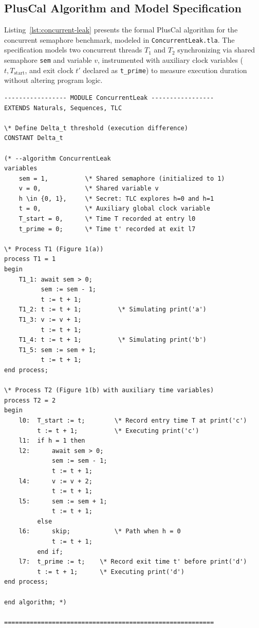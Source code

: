 \documentclass[a4paper,12pt]{report}
\begin{document}
\subsection{PlusCal Algorithm and Model Specification}
Listing~\ref{lst:concurrent-leak} presents the formal PlusCal algorithm for the concurrent semaphore benchmark, modeled in \texttt{ConcurrentLeak.tla}. The specification models two concurrent threads $T_1$ and $T_2$ synchronizing via shared semaphore \texttt{sem} and variable $v$, instrumented with auxiliary clock variables ($t, T_{\text{start}}$, and exit clock $t'$ declared as \texttt{t\_prime}) to measure execution duration without altering program logic.

\begin{lstlisting}[style=pluscalstyle, caption={TLA+\slash PlusCal specification for the concurrent semaphore benchmark.}, label={lst:concurrent-leak}]
----------------- MODULE ConcurrentLeak -----------------
EXTENDS Naturals, Sequences, TLC

\* Define Delta_t threshold (execution difference)
CONSTANT Delta_t

(* --algorithm ConcurrentLeak
variables
    sem = 1,          \* Shared semaphore (initialized to 1)
    v = 0,            \* Shared variable v
    h \in {0, 1},     \* Secret: TLC explores h=0 and h=1
    t = 0,            \* Auxiliary global clock variable
    T_start = 0,      \* Time T recorded at entry l0
    t_prime = 0;      \* Time t' recorded at exit l7

\* Process T1 (Figure 1(a))
process T1 = 1
begin
    T1_1: await sem > 0;
          sem := sem - 1;
          t := t + 1;
    T1_2: t := t + 1;          \* Simulating print('a')
    T1_3: v := v + 1;
          t := t + 1;
    T1_4: t := t + 1;          \* Simulating print('b')
    T1_5: sem := sem + 1;
          t := t + 1;
end process;

\* Process T2 (Figure 1(b) with auxiliary time variables)
process T2 = 2
begin
    l0:  T_start := t;        \* Record entry time T at print('c')
         t := t + 1;          \* Executing print('c')
    l1:  if h = 1 then
    l2:      await sem > 0;
             sem := sem - 1;
             t := t + 1;
    l4:      v := v + 2;
             t := t + 1;
    l5:      sem := sem + 1;
             t := t + 1;
         else
    l6:      skip;            \* Path when h = 0
             t := t + 1;
         end if;
    l7:  t_prime := t;    \* Record exit time t' before print('d')
         t := t + 1;      \* Executing print('d')
end process;

end algorithm; *)

=========================================================
\end{lstlisting}
\end{document}
